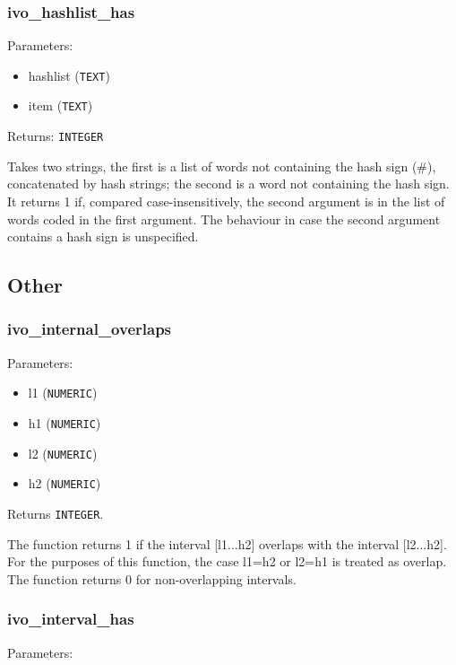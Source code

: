 \documentclass[11pt,a4paper]{ivoa}
\begin{document}
\subsubsection{ivo\_hashlist\_has}

Parameters:

\begin{itemize}
	\item hashlist (\texttt{TEXT})
	\item item (\texttt{TEXT})
\end{itemize}

Returns: \texttt{INTEGER}

Takes two strings, the first is a list of words not containing the hash
sign (\#), concatenated by hash strings; the second is a word not
containing the hash sign. It returns 1 if, compared case-insensitively,
the second argument is in the list of words coded in the first argument.
The behaviour in case the second argument contains a hash sign is
unspecified.

\subsection{Other}

\subsubsection{ivo\_internal\_overlaps}

Parameters:

\begin{itemize}
	\item l1 (\texttt{NUMERIC})
	\item h1 (\texttt{NUMERIC})
	\item l2 (\texttt{NUMERIC})
	\item h2 (\texttt{NUMERIC})
\end{itemize}

Returns \texttt{INTEGER}.

The function returns 1 if the interval [l1...h2] overlaps with the
interval [l2...h2]. For the purposes of this function, the case l1=h2 or
l2=h1 is treated as overlap. The function returns 0 for non-overlapping
intervals.

\subsubsection{ivo\_interval\_has}

Parameters:
\end{document}
